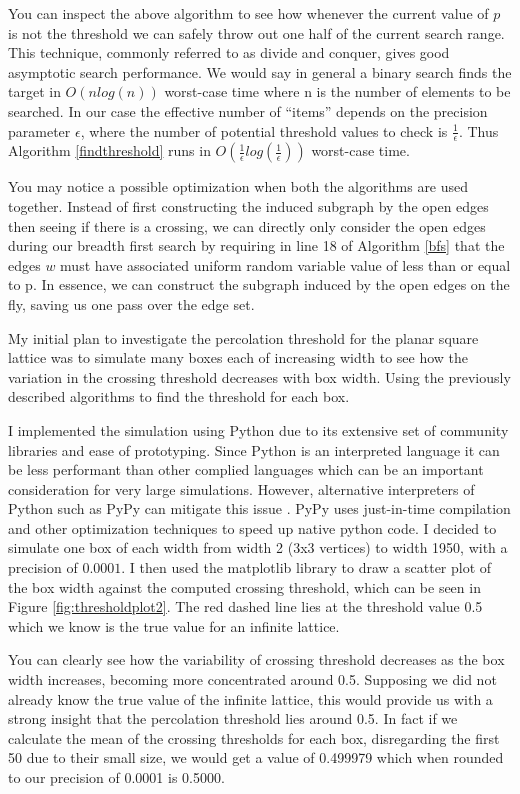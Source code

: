\documentclass[a4paper,11pt]{article}
\theoremstyle{definition}
\begin{document}
You can inspect the above algorithm to see how whenever the current value of $p$ is not the threshold we can safely throw out one half of the current search range. This technique, commonly referred to as divide and conquer, gives good asymptotic search performance. We would say in general a binary search finds the target in $O(nlog(n))$ worst-case time where n is the number of elements to be searched. In our case the effective number of ``items'' depends on the precision parameter $\epsilon$, where the number of potential threshold values to check is $\frac{1}{\epsilon}$. Thus Algorithm \ref*{findthreshold} runs in $O(\frac{1}{\epsilon}log(\frac{1}{\epsilon}))$ worst-case time.

You may notice a possible optimization when both the algorithms are used together. Instead of first constructing the induced subgraph by the open edges then seeing if there is a crossing, we can directly only consider the open edges during our breadth first search by requiring in line 18 of Algorithm \ref*{bfs} that the edges $w$ must have associated uniform random variable value of less than or equal to p. In essence, we can construct the subgraph induced by the open edges on the fly, saving us one pass over the edge set. 

My initial plan to investigate the percolation threshold for the planar square lattice was to simulate many boxes each of increasing width to see how the variation in the crossing threshold decreases with box width. Using the previously described algorithms to find the threshold for each box.

I implemented the simulation using Python due to its extensive set of community libraries and ease of prototyping. Since Python is an interpreted language it can be less performant than other complied languages which can be an important consideration for very large simulations. However, alternative interpreters  of Python such as PyPy can mitigate this issue \cite{PyPy}. PyPy uses just-in-time compilation and other optimization techniques to speed up native python code.
I decided to simulate one box of each width from width 2 (3x3 vertices) to width 1950, with a precision of $0.0001$. I then used the matplotlib library to draw a scatter plot of the box width against the computed crossing threshold, which can be seen in Figure \ref*{fig:thresholdplot2}. The red dashed line lies at the threshold value 0.5 which we know is the true value for an infinite lattice.

You can clearly see how the variability of crossing threshold decreases as the box width increases, becoming more concentrated around 0.5. Supposing we did not already know the true value of the infinite lattice, this would provide us with a strong insight that the percolation threshold lies around 0.5. In fact if we calculate the mean of the crossing thresholds for each box, disregarding the first 50 due to their small size, we would get a value of 0.499979 which when rounded to our precision of 0.0001 is 0.5000.
\end{document}
